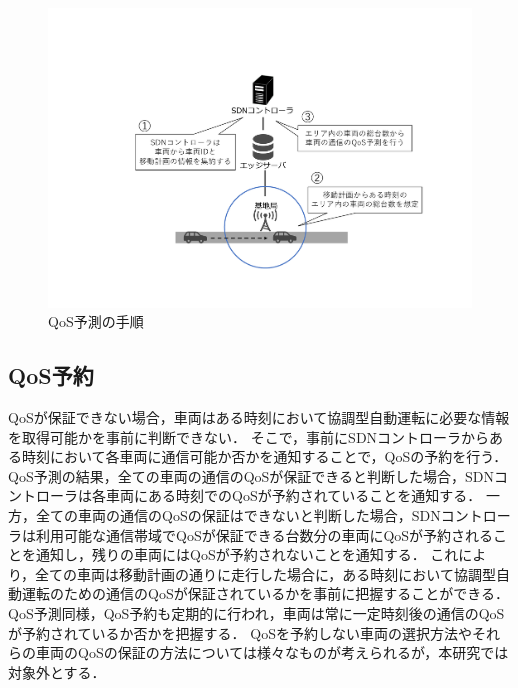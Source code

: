 \documentclass[a4paper,10pt,twocolumn,uplatex]{jsarticle}
\begin{document}
\begin{figure}[t]
	\begin{centering}
    \includegraphics[width=\linewidth]{img/202306_QoSprediction.pdf}
    \caption{QoS予測の手順}
    \label{fig:QoSprediction}
    \end{centering}
\end{figure}

\subsection{QoS予約}
QoSが保証できない場合，車両はある時刻において協調型自動運転に必要な情報を取得可能かを事前に判断できない．
そこで，事前にSDNコントローラからある時刻において各車両に通信可能か否かを通知することで，QoSの予約を行う．
QoS予測の結果，全ての車両の通信のQoSが保証できると判断した場合，SDNコントローラは各車両にある時刻でのQoSが予約されていることを通知する．
一方，全ての車両の通信のQoSの保証はできないと判断した場合，SDNコントローラは利用可能な通信帯域でQoSが保証できる台数分の車両にQoSが予約されることを通知し，残りの車両にはQoSが予約されないことを通知する．
これにより，全ての車両は移動計画の通りに走行した場合に，ある時刻において協調型自動運転のための通信のQoSが保証されているかを事前に把握することができる．
QoS予測同様，QoS予約も定期的に行われ，車両は常に一定時刻後の通信のQoSが予約されているか否かを把握する．
QoSを予約しない車両の選択方法やそれらの車両のQoSの保証の方法については様々なものが考えられるが，本研究では対象外とする．

\end{document}
